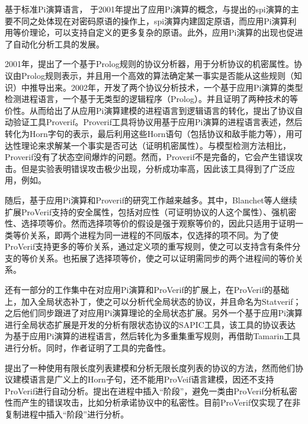 基于标准Pi演算语言\citep{milner1999communicating}，\citet{abadi2001mobile,abadi2017applied} 于2001年提出了应用Pi演算的概念，与\citet{abadi1997calculus}提出的spi演算的主要不同之处体现在对密码原语的操作上，spi演算内建固定原语，而应用Pi演算利用等价理论，可以支持自定义的更多复杂的原语。此外，应用Pi演算的出现也促进了自动化分析工具的发展。

2001年，\citet{blanchet2001efficient}提出了一个基于Prolog规则的协议分析器，用于分析协议的机密属性。协议由Prolog规则表示，并且用一个高效的算法确定某一事实是否能从这些规则（知识）中推导出来。2002年，\citet{abadi2002analyzing,abadi2005analyzing}开发了两个协议分析技术，一个基于应用Pi演算的类型检测进程语言，一个基于无类型的逻辑程序（Prolog）。并且证明了两种技术的等价性。从而给出了从应用Pi演算建模的进程语言到逻辑语言的转化，提出了协议自动验证工具Proverif。Proverif工具将协议用基于应用Pi演算的进程语言表述，然后转化为Horn字句的表示，最后利用这些Horn语句（包括协议和敌手能力等），用可达性理论来求解某一个事实是否可达（证明机密属性）。与模型检测方法相比，Proverif没有了状态空间爆炸的问题。然而，Proverif不是完备的，它会产生错误攻击。但是实验表明错误攻击极少出现，分析成功率高，因此该工具得到了广泛应用，例如\citep{blanchet2008automated,bhargavan2017verified}。

随后，基于应用Pi演算和Proverif的研究工作越来越多。其中，Blanchet等人继续扩展ProVerif支持的安全属性，包括对应性（可证明协议的人这个属性）\citep{blanchet2002secrecy,blanchet2009automatic}、强机密性\citep{blanchet2004automatic}、选择项等价\citep{blanchet2005automated}。然而选择项等价的假设是强于观察等价的，因此只适用于证明一类等价关系，即两个进程为同一进程的不同版本，仅选择的项不同。为了使ProVerif支持更多的等价关系，\citet{cheval2013proving}通过定义项的重写规则，使之可以支持含有条件分支的等价关系。\citet{blanchet2016automated}也拓展了选择项等价，使之可以证明需同步的两个进程间的等价关系。

还有一部分的工作集中在对应用Pi演算和ProVerif的扩展上，\citet{arapinis2011statverif}在ProVerif的基础上，加入全局状态补丁，使之可以分析代全局状态的协议，并且命名为Statverif；之后他们同步跟进了对应用Pi演算理论的全局状态扩展\citep{arapinis2014stateful}。另外一个基于应用Pi演算进行全局状态扩展是\citet{kremer2016automated}开发的分析有限状态协议的SAPIC工具，该工具的协议表达为基于应用Pi演算的进程语言，然后转化为多重集重写规则，再借助Tamarin工具\citep{schmidt2014automated}进行分析。同时，作者证明了工具的完备性。

\citet{paiola2012verification}提出了一种使用有限长度列表建模和分析无限长度列表的协议的方法，然而他们协议建模语言是广义上的Horn子句，还不能用ProVeif语言建模，因还不支持ProVerif进行自动分析。\citet{chothia2015automatically}提出在进程中插入“阶段”，避免一类由ProVerif分析私密性而产生的错误攻击，比如分析承诺协议中的私密性。目前ProVerif仅实现了在非复制进程中插入“阶段”进行分析。

